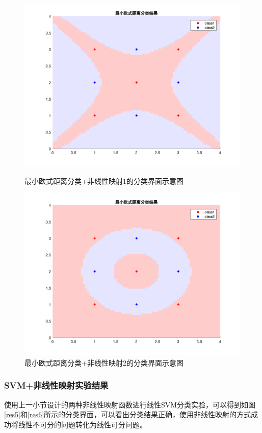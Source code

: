 \documentclass[cn]{elegantbook}
\begin{document}
\begin{figure}[!h]
	\centering
	\begin{minipage}{0.48\linewidth}
		\includegraphics[width=\textwidth]{../results/non1}
		\caption{\label{res2}最小欧式距离分类+非线性映射1的分类界面示意图}
	\end{minipage}
	\begin{minipage}{0.48\linewidth}
		\includegraphics[width=\textwidth]{../results/non2}
		\caption{\label{res3}最小欧式距离分类+非线性映射2的分类界面示意图}
	\end{minipage}
\end{figure}

\subsubsection{SVM+非线性映射实验结果}
使用上一小节设计的两种非线性映射函数进行线性SVM分类实验，可以得到如图\ref{res5}和\ref{res6}所示的分类界面，可以看出分类结果正确，使用非线性映射的方式成功将线性不可分的问题转化为线性可分问题。
\end{document}
